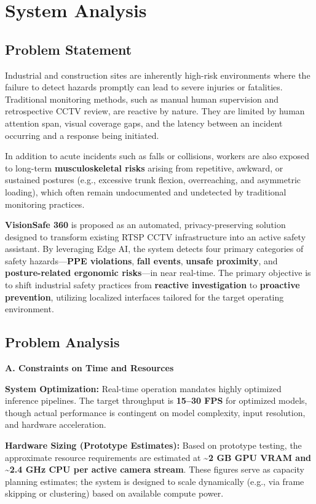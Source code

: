 \chapter{System Analysis}

\section{Problem Statement}

Industrial and construction sites are inherently high-risk environments where the failure to detect hazards promptly can lead to severe injuries or fatalities. Traditional monitoring methods, such as manual human supervision and retrospective CCTV review, are reactive by nature. They are limited by human attention span, visual coverage gaps, and the latency between an incident occurring and a response being initiated.

In addition to acute incidents such as falls or collisions, workers are also exposed to long-term \textbf{musculoskeletal risks} arising from repetitive, awkward, or sustained postures (e.g., excessive trunk flexion, overreaching, and asymmetric loading), which often remain undocumented and undetected by traditional monitoring practices.

\textbf{VisionSafe 360} is proposed as an automated, privacy-preserving solution designed to transform existing RTSP CCTV infrastructure into an active safety assistant. By leveraging Edge AI, the system detects four primary categories of safety hazards—\textbf{PPE violations}, \textbf{fall events}, \textbf{unsafe proximity}, and \textbf{posture-related ergonomic risks}—in near real-time. The primary objective is to shift industrial safety practices from \textbf{reactive investigation} to \textbf{proactive prevention}, utilizing localized interfaces tailored for the target operating environment.

\section{Problem Analysis}

\textbf{A. Constraints on Time and Resources}

\textbf{System Optimization:} Real-time operation mandates highly optimized inference pipelines. The target throughput is \textbf{15–30 FPS} for optimized models, though actual performance is contingent on model complexity, input resolution, and hardware acceleration.

\textbf{Hardware Sizing (Prototype Estimates):} Based on prototype testing, the approximate resource requirements are estimated at \textbf{\textasciitilde{}2 GB GPU VRAM and \textasciitilde{}2.4 GHz CPU per active camera stream}. These figures serve as capacity planning estimates; the system is designed to scale dynamically (e.g., via frame skipping or clustering) based on available compute power.

